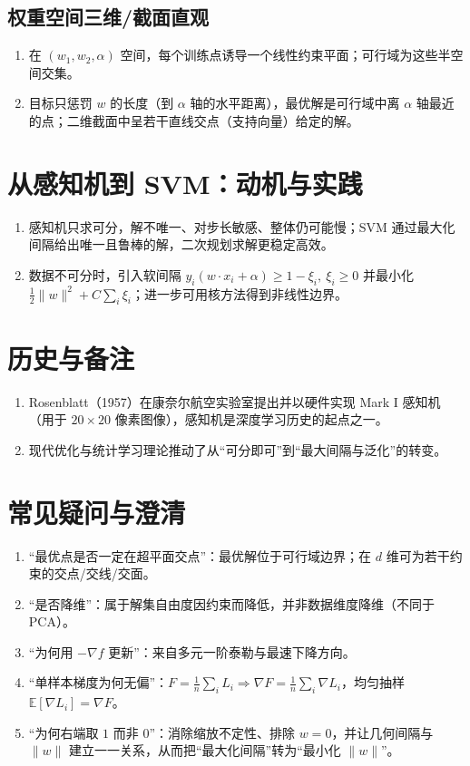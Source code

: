 \documentclass[10.5pt,hyperref,a4paper,UTF8]{ctexart}
\begin{document}
\subsection{权重空间三维/截面直观}
\begin{enumerate}
  \item 在 $(w_1,w_2,\alpha)$ 空间，每个训练点诱导一个线性约束平面；可行域为这些半空间交集。
  \item 目标只惩罚 $w$ 的长度（到 $\alpha$ 轴的水平距离），最优解是可行域中离 $\alpha$ 轴最近的点；二维截面中呈若干直线交点（支持向量）给定的解。
\end{enumerate}

\section{从感知机到 SVM：动机与实践}
\begin{enumerate}
  \item 感知机只求可分，解不唯一、对步长敏感、整体仍可能慢；SVM 通过最大化间隔给出唯一且鲁棒的解，二次规划求解更稳定高效。
  \item 数据不可分时，引入软间隔 $y_i(w\cdot x_i+\alpha)\ge 1-\xi_i,\ \xi_i\ge0$ 并最小化 $\frac12\|w\|^2+C\sum_i\xi_i$；进一步可用核方法得到非线性边界。
\end{enumerate}

\section{历史与备注}
\begin{enumerate}
  \item Rosenblatt（1957）在康奈尔航空实验室提出并以硬件实现 Mark I 感知机（用于 $20\times20$ 像素图像），感知机是深度学习历史的起点之一。
  \item 现代优化与统计学习理论推动了从“可分即可”到“最大间隔与泛化”的转变。
\end{enumerate}

\section{常见疑问与澄清}
\begin{enumerate}
  \item “最优点是否一定在超平面交点”：最优解位于可行域边界；在 $d$ 维可为若干约束的交点/交线/交面。
  \item “是否降维”：属于解集自由度因约束而降低，并非数据维度降维（不同于 PCA）。
  \item “为何用 $-\nabla f$ 更新”：来自多元一阶泰勒与最速下降方向。
  \item “单样本梯度为何无偏”：$F=\frac1n\sum_i L_i \Rightarrow \nabla F=\frac1n\sum_i\nabla L_i$，均匀抽样 $\mathbb E[\nabla L_i]=\nabla F$。
  \item “为何右端取 $1$ 而非 $0$”：消除缩放不定性、排除 $w=0$，并让几何间隔与 $\|w\|$ 建立一一关系，从而把“最大化间隔”转为“最小化 $\|w\|$”。
\end{enumerate}



\newpage
{}
\end{document}
